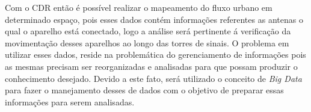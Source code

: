 Com o CDR então é possível realizar o mapeamento do fluxo urbano em determinado espaço,
pois esses dados contém informações referentes as antenas o qual o aparelho está conectado, logo
a análise será pertinente á verificação da movimentação desses aparelhos ao longo das torres
de sinais. O problema em utilizar esses dados, reside na problemática do gerenciamento de
informações pois as mesmas precisam ser reorganizadas e analisadas para que possam produzir o conhecimento
desejado. Devido a este fato, será utilizado o conceito de \textit{Big Data} para fazer o manejamento
desses de dados com o objetivo de preparar essas informações para serem analisadas.


